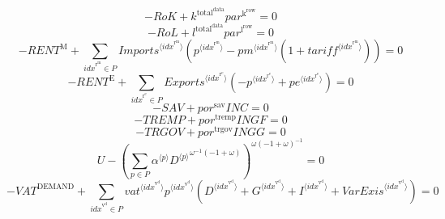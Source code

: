 \begin{equation}
-{R\!o\!K} + {k^{\mathrm{total}^{\mathrm{data}}}} {{p\!a\!r}^{\mathrm{k}^{\mathrm{row}}}} = 0
\end{equation}
\begin{equation}
-{R\!o\!L} + {l^{\mathrm{total}^{\mathrm{data}}}} {{p\!a\!r}^{\mathrm{l}^{\mathrm{row}}}} = 0
\end{equation}
\begin{equation}
-{R\!E\!N\!T}^{\mathrm{M}} + \sum_{{i\!d\!x}^{\mathrm{r}^{\mathrm{m}}}\in P} {{{I\!m\!p\!o\!r\!t\!s}}^{\langle {i\!d\!x}^{\mathrm{r}^{\mathrm{m}}}\rangle}} \left({p}^{\langle {i\!d\!x}^{\mathrm{r}^{\mathrm{m}}}\rangle} - {{{p\!m}}^{\langle {i\!d\!x}^{\mathrm{r}^{\mathrm{m}}}\rangle}} \left(1 + {{t\!a\!r\!i\!f\!f}}^{\langle {i\!d\!x}^{\mathrm{r}^{\mathrm{m}}}\rangle}\right)\right) = 0
\end{equation}
\begin{equation}
-{R\!E\!N\!T}^{\mathrm{E}} + \sum_{{i\!d\!x}^{\mathrm{r}^{\mathrm{e}}}\in P} {{{E\!x\!p\!o\!r\!t\!s}}^{\langle {i\!d\!x}^{\mathrm{r}^{\mathrm{e}}}\rangle}} \left(-{p}^{\langle {i\!d\!x}^{\mathrm{r}^{\mathrm{e}}}\rangle} + {{p\!e}}^{\langle {i\!d\!x}^{\mathrm{r}^{\mathrm{e}}}\rangle}\right) = 0
\end{equation}
\begin{equation}
-{S\!A\!V} + {{p\!o\!r}^{\mathrm{sav}}} {{I\!N\!C}} = 0
\end{equation}
\begin{equation}
-{T\!R\!E\!M\!P} + {{p\!o\!r}^{\mathrm{tremp}}} {{I\!N\!G\!F}} = 0
\end{equation}
\begin{equation}
-{T\!R\!G\!O\!V} + {{p\!o\!r}^{\mathrm{trgov}}} {{I\!N\!G\!G}} = 0
\end{equation}
\begin{equation}
U - \left(\sum_{p\in P} {{\alpha}^{\langle p\rangle}} {{{D}^{\langle p\rangle}}^{{\omega}^{-1} \left(-1 + \omega\right)}}\right)^{{\omega} \left(-1 + \omega\right)^{-1}} = 0
\end{equation}
\begin{equation}
-{V\!A\!T}^{\mathrm{DEMAND}} + \sum_{{i\!d\!x}^{\mathrm{v}^{\mathrm{d}}}\in P} {{{v\!a\!t}}^{\langle {i\!d\!x}^{\mathrm{v}^{\mathrm{d}}}\rangle}} {{p}^{\langle {i\!d\!x}^{\mathrm{v}^{\mathrm{d}}}\rangle}} \left({D}^{\langle {i\!d\!x}^{\mathrm{v}^{\mathrm{d}}}\rangle} + {G}^{\langle {i\!d\!x}^{\mathrm{v}^{\mathrm{d}}}\rangle} + {I}^{\langle {i\!d\!x}^{\mathrm{v}^{\mathrm{d}}}\rangle} + {{V\!a\!r\!E\!x\!i\!s}}^{\langle {i\!d\!x}^{\mathrm{v}^{\mathrm{d}}}\rangle}\right) = 0
\end{equation}
